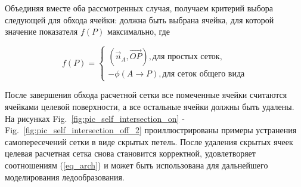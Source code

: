Объединяя вместе оба рассмотренных случая, получаем критерий выбора следующей для обхода ячейки: должна быть выбрана ячейка, для которой значение показателя $f(P)$ максимально, где

\begin{equation}
f(P) = 
\begin{cases}
(\vec{n}_A, \vec{OP}), \text{для простых сеток}, \\
-\phi(A \rightarrow P), \text{для сеток общего вида}
\end{cases}
\end{equation}

После завершения обхода расчетной сетки все помеченные ячейки считаются ячейками целевой поверхности, а все остальные ячейки должны быть удалены.
На рисунках Fig.~\ref{fig:pic_self_intersection_on} - Fig.~\ref{fig:pic_self_intersection_off_2} проиллюстрированы примеры устранения самопересечений сетки в виде скрытых петель.
После удаления скрытых ячеек целевая расчетная сетка снова становится корректной, удовлетворяет соотношениям (\ref{eq_arch}) и может быть использована для дальнейшего моделирования ледообразования.

